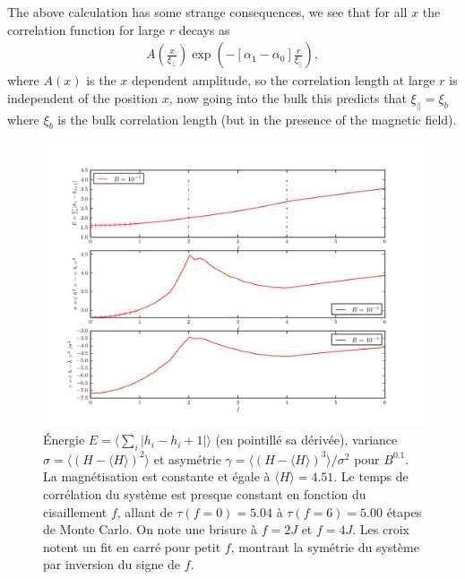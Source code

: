 The above calculation has some strange consequences, we see that for all $x$ the correlation function for large $r$ 
decays as 
\begin{align}
A(\frac{x}{\xi_\perp})\exp(-[\alpha_1-\alpha_0] \frac{r}{\xi_{||}}),
\end{align}
where $A(x)$ is the $x$ dependent amplitude, so the correlation length at large $r$ is independent of the position
$x$, now going into the bulk this predicts that $\xi_{||} = \xi_b$ where $\xi_b$ is the bulk correlation length (but in the presence of the magnetic field). 


\begin{figure}[h]
	\includegraphics[width=\linewidth]{./sosequi-laser/sosj1.pdf}
	\caption{Énergie $E= \langle \sum_i |h_i-h_i+1| \rangle$ (en pointillé sa dérivée), variance $\sigma = \langle (H - \langle H \rangle )^2  \rangle$ et asymétrie $\gamma = \langle (H - \langle H \rangle )^3  \rangle / \sigma^2$ pour $B^0.1$. La magnétisation est constante et égale à $\langle H \rangle = 4.51$. Le temps de corrélation du système est presque constant en fonction du cisaillement $f$, allant de  $\tau(f=0) = 5.04$ à $\tau(f=6) = 5.00$ étapes de Monte Carlo. On note une brisure à $f=2J$ et $f=4J$.
Les croix notent un fit en carré pour petit $f$, montrant la symétrie du système par inversion du signe de $f$. }
\end{figure}

